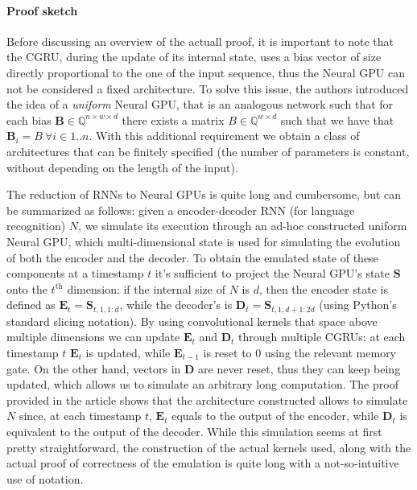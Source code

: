 \documentclass{article}
\begin{document}
\paragraph{Proof sketch}

Before discussing an overview of the actuall proof, it is important to note that the CGRU, during the update of its internal state, uses a bias vector of size directly proportional to the one of the input sequence, thus the Neural GPU can not be considered a fixed architecture. To solve this issue, the authors introduced the idea of a \textit{uniform} Neural GPU, that is an analogous network such that for each bias $\mathbf{B} \in \mathbb{Q}^{n \times w \times d}$ there exists a matrix $B \in \mathbb{Q}^{w \times d}$ such that we have that $\mathbf{B}_i = B\ \forall i \in {1..n}$. With this additional requirement we obtain a class of architectures that can be finitely specified (the number of parameters is constant, without depending on the length of the input).

The reduction of RNNs to Neural GPUs is quite long and cumbersome, but can be summarized as follows: given a encoder-decoder RNN (for language recognition) $N$, we simulate its execution through an ad-hoc constructed uniform Neural GPU, which multi-dimensional state is used for simulating the evolution of both the encoder and the decoder. To obtain the emulated state of these components at a timestamp $t$ it's sufficient to project the Neural GPU's state $\mathbf{S}$ onto the $t^{\textrm{th}}$ dimension: if the internal size of $N$ is $d$, then the encoder state is defined as $\mathbf{E}_t = \mathbf{S}_{t,1,1:d}$, while the decoder's is $\mathbf{D}_t = \mathbf{S}_{t,1,d+1:2d}$ (using Python's standard slicing notation). By using convolutional kernels that space above multiple dimensions we can update $\mathbf{E}_t$ and $\mathbf{D}_t$ through multiple CGRUs: at each timestamp $t$ $\mathbf{E}_t$ is updated, while $\mathbf{E}_{t-1}$ is reset to $0$ using the relevant memory gate. On the other hand, vectors in $\mathbf{D}$ are never reset, thus they can keep being updated, which allows us to simulate an arbitrary long computation. The proof provided in the article shows that the architecture constructed allows to simulate $N$ since, at each timestamp $t$, $\mathbf{E}_t$ equals to the output of the encoder, while $\mathbf{D}_t$ is equivalent to the output of the decoder. While this simulation seems at first pretty straightforward, the construction of the actual kernels used, along with the actual proof of correctness of the emulation is quite long with a not-so-intuitive use of notation.
\end{document}
